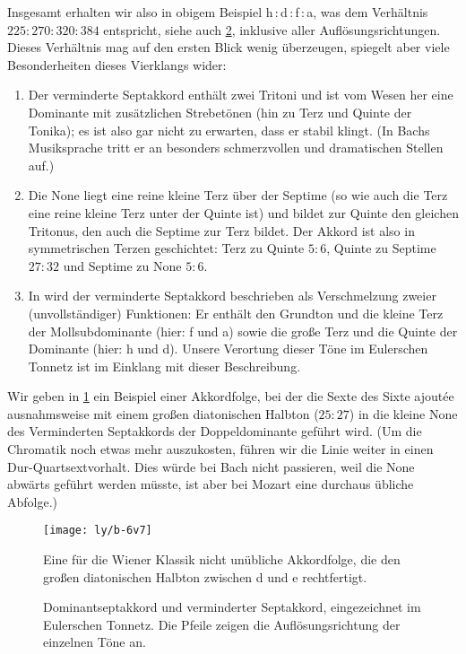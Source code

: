 Insgesamt erhalten wir also in obigem Beispiel \naturalm
h\,:\,d\,:\,f\,:\,\flatp a, was dem Verhältnis $225:270:320:384$ entspricht,
siehe auch \cref{fig:chordLinessevenths}, inklusive aller Auflösungsrichtungen.
Dieses Verhältnis mag auf den ersten Blick wenig überzeugen, spiegelt aber viele
Besonderheiten dieses Vierklangs wider:
\begin{enumerate}
\item Der verminderte Septakkord enthält zwei Tritoni und ist vom Wesen her eine
  Dominante mit zusätzlichen Strebetönen (hin zu Terz und Quinte der Tonika); es
  ist also gar nicht zu erwarten, dass er stabil klingt.  (In Bachs Musiksprache
  tritt er an besonders schmerzvollen und dramatischen Stellen auf.)
\item Die None liegt eine reine kleine Terz über der Septime (so wie auch die
  Terz eine reine kleine Terz unter der Quinte ist) und bildet zur Quinte den
  gleichen Tritonus, den auch die Septime zur Terz bildet.  Der Akkord ist also
  in symmetrischen Terzen geschichtet: Terz zu Quinte $5:6$, Quinte zu Septime
  $27:32$ und Septime zu None $5:6$.
\item In \cite[S.\,92ff.]{deLaMotte} wird der verminderte Septakkord beschrieben
  als Verschmelzung zweier (unvollständiger) Funktionen: Er enthält den Grundton
  und die kleine Terz der Mollsubdominante (hier: f und \flat a) sowie die große
  Terz und die Quinte der Dominante (hier: h und d).  Unsere Verortung dieser
  Töne im Eulerschen Tonnetz ist im Einklang mit dieser Beschreibung.
\end{enumerate}
Wir geben in \cref{fig:6v7} ein Beispiel einer Akkordfolge, bei der die Sexte
des Sixte ajoutée ausnahmsweise mit einem großen diatonischen Halbton ($25:27$)
in die kleine None des Verminderten Septakkords der Doppeldominante geführt
wird. (Um die Chromatik noch etwas mehr auszukosten, führen wir die Linie weiter
in einen Dur-Quartsextvorhalt.  Dies würde bei Bach nicht passieren, weil die
None abwärts geführt werden müsste, ist aber bei Mozart eine durchaus übliche
Abfolge.)

\begin{figure}
  \centering
  \texttt{[image: ly/b-6v7]}
  \caption{Eine für die Wiener Klassik nicht unübliche Akkordfolge, die den
    großen diatonischen Halbton zwischen \naturalm d und \flatp e rechtfertigt.}\label{fig:6v7}
\end{figure}

\begin{figure}[h]
  \centering
  
  \caption{Dominantseptakkord und verminderter Septakkord, eingezeichnet im Eulerschen
    Tonnetz. Die Pfeile zeigen die Auflösungsrichtung der einzelnen Töne
    an.}\label{fig:chordLinessevenths}
\end{figure}

